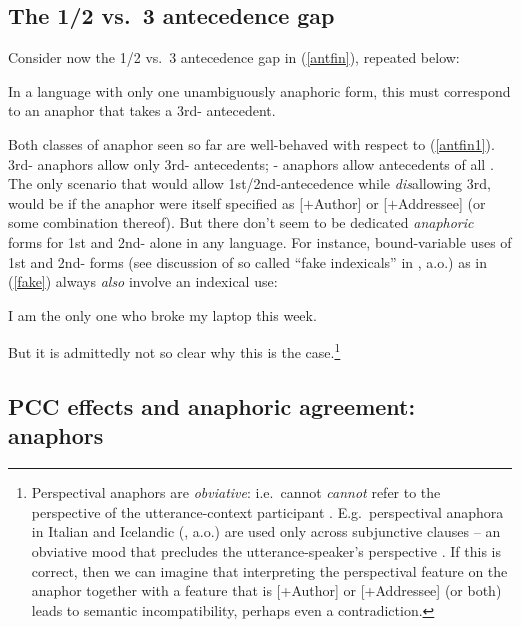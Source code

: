 \documentclass[output=paper, modfonts, nonflat]{langsci/langscibook}
\begin{document}
\subsection{The 1/2 vs.\ 3 antecedence gap}

Consider now the 1/2 vs.\ 3 antecedence gap in (\ref{antfin}), repeated
below: 

\ea\label{antfin1} In a language with only one unambiguously anaphoric
form, this must correspond to an anaphor that takes a 3rd-\person{}
antecedent.  \z 

\noindent Both classes of anaphor seen so far are well-behaved with respect to
(\ref{antfin1}).  3rd-\person{} anaphors allow only 3rd-\person{}
antecedents; \nul-\person{} anaphors allow antecedents of all
\person. The only scenario that would allow 1st/2nd-antecedence while
\emph{dis}allowing 3rd, would be if the anaphor were itself specified
as [$+$Author] or [$+$Addressee] (or some combination thereof). But
there don't seem to be dedicated \emph{anaphoric} forms for 1st and
2nd-\person{} alone in any language. For instance, bound-variable uses
of 1st and 2nd-\person{} forms (see discussion of so called
``fake indexicals'' in \citealt{vonstechow:2002, kratzer:2009}, a.o.) as in
(\ref{fake}) always {\itshape also} involve an indexical use: \vspace{-1ex}

\ea\label{fake} I am the only one who broke my laptop this week.  \z

\noindent But it is admittedly not so clear why this is the case.\footnote{
  Perspectival anaphors are {\itshape obviative}: i.e.\ cannot {\itshape cannot}
  refer to the perspective of the utterance-context participant
  \citep{sundaresan:2012, sundaresan:2018, sundaresanpearson:2014}. 
  E.g.\ perspectival anaphora in Italian
  \citep{giorgi:2010} and Icelandic (\citealt{Hicks:2009,
    Reuland:2011}, a.o.) are used only across subjunctive clauses -- an
  obviative mood that precludes the utterance-speaker's perspective
  \citep{hellan:1988, sigurdsson:2010}. If this is correct, then we
  can imagine that interpreting the perspectival feature on the
  anaphor together with a feature that is [+Author] or [+Addressee]
  (or both) leads to semantic incompatibility, perhaps even a
  contradiction.}




\subsection{PCC effects and anaphoric agreement:  anaphors}
\end{document}
